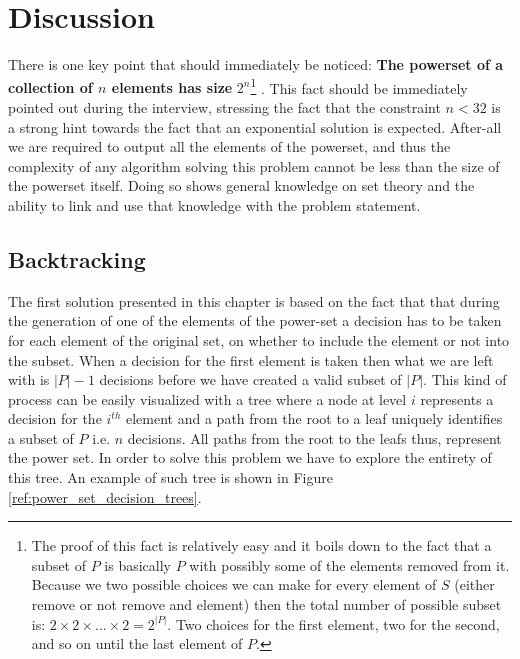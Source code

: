\section{Discussion}
There is one key point that should immediately be noticed: \textbf{The powerset of a collection of
	$n$ elements has size} $\boxed{2^n}$\footnote{The proof of this fact is relatively easy and it boils
	down to the fact that a subset of $P$ is basically $P$ with possibly some of the elements
	removed from it. Because we two possible choices we can make for every element of $S$ (either
	remove or not remove and element) then the total number of possible subset is: $2 \times 2
	\times \ldots \times 2 = 2^{|P|}$. Two choices for the first element, two for the second, and so
	on until the last element of $P$.} . This fact should be immediately pointed out during the
	interview, stressing the fact that the constraint $n < 32$ is a strong hint towards the fact
	that an exponential solution is expected. After-all we are required to output all the elements
	of the powerset, and thus the complexity of any algorithm solving this problem cannot be less
	than the size of the powerset itself. Doing so shows general knowledge on set theory and the
	ability to link and use that knowledge with the problem statement.


\subsection{Backtracking}
The first solution presented in this chapter is based on the fact that that during the generation of
one of the elements of the power-set a decision has to be taken for each element of the original
set, on whether to include the element or not into the subset. When a decision for the first element
is taken then what we are left with is $|P|-1$ decisions before we have created a valid subset of
$|P|$. 
This kind of process can be easily visualized with a tree where a node at level $i$
represents a decision for the $i^{th}$ element and a path from the root to a leaf uniquely
identifies a subset of $P$ i.e. $n$ decisions. 
All paths from the root to the leafs thus, represent the power set. In
order to solve this problem we have to explore the entirety of this tree. An example of such tree is
shown in Figure \ref{ref:power_set_decision_trees}.

